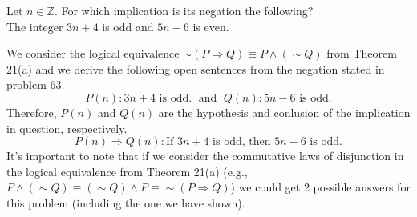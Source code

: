 \documentclass[12pt]{article}
\newcommand{\Z}{\mathbb{Z}}
\newenvironment{problem}[2][Problem]{\begin{trivlist}
		\item[\hskip \labelsep {\bfseries #1}\hskip \labelsep {\bfseries #2.}]}{\end{trivlist}}
\newenvironment{solution}[2][Solution]{\begin{trivlist}
		\item[\hskip \labelsep {\bfseries #1}\hskip \labelsep {\bfseries #2.}]}{\end{trivlist}}
\begin{document}
\begin{problem}{63}
	Let $n \in \Z$. For which implication is its negation the following?\\
	The integer $3n + 4$ is odd and $5n -6$ is even.
	\begin{solution}{}
	We consider the logical equivalence $\sim(P \Rightarrow Q) \equiv P \wedge (\sim Q)$ from Theorem 21(a) and we derive the following open sentences from the negation stated in problem 63.
	\begin{equation*}
	P(n):3n + 4 \text{ is odd.} \; \text{ and } \; Q(n):5n - 6 \text{ is odd.}
	\end{equation*}
	Therefore, $P(n)$ and $Q(n)$ are the hypothesis and conlusion of the implication in question, respectively. 
	\begin{equation*} 
		P(n)\Rightarrow Q(n):\text{If }3n+4 \text{ is odd, then } 5n - 6 \text{ is odd.}
	\end{equation*} 
	It's important to note that if we consider the commutative laws of disjunction in the logical equivalence from Theorem 21(a) (e.g., $P\wedge (\sim Q) \equiv (\sim Q) \wedge P \equiv \sim(P\Rightarrow Q)$) we could get 2 possible answers for this problem (including the one we have shown).
	\end{solution}
\end{problem}
\end{document}
